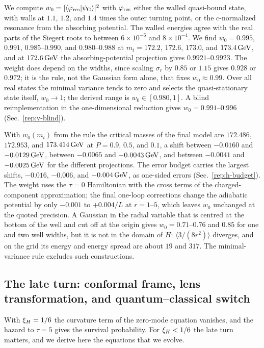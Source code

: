 We compute $w_0=|\langle\varphi_{\rm res}|\psi_{\rm G}\rangle|^2$ with $\varphi_{\rm res}$ either the walled quasi-bound state, with walls at $1.1$, $1.2$, and $1.4$ times the outer turning point, or the c-normalized resonance from the absorbing potential. %
The walled energies agree with the real parts of the Siegert roots to between $6\times10^{-6}$ and $8\times10^{-4}$. %
We find $w_0=0.995$, $0.991$, $0.985$--$0.990$, and $0.980$--$0.988$ at $m_t=172.2$, $172.6$, $173.0$, and $173.4\,\mathrm{GeV}$, and at $172.6\,\mathrm{GeV}$ the absorbing-potential projection gives $0.9921$--$0.9923$. %
The weight does depend on the widths, since scaling $\sigma_r$ by $0.85$ or $1.15$ gives $0.928$ or $0.972$; it is the rule, not the Gaussian form alone, that fixes $w_0\approx0.99$. %
Over all real states the minimal variance tends to zero and selects the quasi-stationary state itself, $w_0\to1$; the derived range is $w_0\in[0.980,1]$. %
A blind reimplementation in the one-dimensional reduction gives $w_0=0.991$--$0.996$ (Sec.~\ref{rep:v-blind}). %

With $w_0(m_t)$ from the rule the critical masses of the final model are $172.486$, $172.953$, and $173.414\,\mathrm{GeV}$ at $P=0.9$, $0.5$, and $0.1$, a shift between $-0.0160$ and $-0.0129\,\mathrm{GeV}$, between $-0.0065$ and $-0.0043\,\mathrm{GeV}$, and between $-0.0041$ and $-0.0025\,\mathrm{GeV}$ for the different projections. %
The error budget carries the largest shifts, $-0.016$, $-0.006$, and $-0.004\,\mathrm{GeV}$, as one-sided errors (Sec.~\ref{rep:h-budget}). %
The weight uses the $\tau=0$ Hamiltonian with the cross terms of the charged-component approximation; the final one-loop corrections change the adiabatic potential by only $-0.001$ to $+0.004/L$ at $r=1$--$5$, which leaves $w_0$ unchanged at the quoted precision. %
A Gaussian in the radial variable that is centred at the bottom of the well and cut off at the origin gives $w_0=0.71$--$0.76$ and $0.85$ for one and two well widths, but it is not in the domain of $H$: $\langle3/(8r^2)\rangle$ diverges, and on the grid its energy and energy spread are about $19$ and $317$. %
The minimal-variance rule excludes such constructions.

\subsection{The late turn: conformal frame, lens transformation, and quantum--classical switch}
\label{sec:rb-late}

With $\xi_H=1/6$ the curvature term of the zero-mode equation vanishes, and the hazard to $\tau=5$ gives the survival probability.
For $\xi_H<1/6$ the late turn matters, and we derive here the equations that we evolve.

